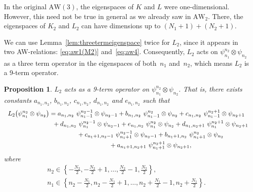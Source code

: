 \documentclass[10pt,a4paper]{amsart}
\numberwithin{equation}{section}
\newtheorem{Proposition}[Theorem]{Proposition}
 { \theoremstyle{definition}
\newtheorem{Definition}[Theorem]{Definition}
\newtheorem{Note}[Theorem]{Note}
\newtheorem{Example}[Theorem]{Example}
\newtheorem{Remark}[Theorem]{Remark} }
\newcommand{\aw}{\mathrm{AW}\!\left(3\right)}
\newcommand{\AW}[1]{\mathrm{AW}_{#1}}
\begin{document}
\begin{Remark}
	In the original $\aw$, the eigenspaces of $K$ and $L$ were one-dimensional. However, this need not be true in general as we already saw in $\AW{2}$. There, the eigenspaces of $K_2$ and $L_2$ can have dimensions up to $(N_1+1)+(N_2+1)$.
\end{Remark}
We can use Lemma~\ref{lem:threetermeigenspace} twice for $L_2$, since it appears in two AW-relations: \eqref{eq:aw1(M2)} and~\eqref{eq:aw4}. Consequently, $L_2$ acts on $\psi_{n_1}^{n_2}\otimes \psi_{n_2}$ as a three term operator in the eigenspaces of both~$n_1$ and~$n_2$, which means $L_2$ is a 9-term operator.
\begin{Proposition}
	$L_2$ acts as a 9-term operator on $\psi_{n_1}^{n_2}\otimes \psi_{n_2}$. That is, there exists constants $a_{n_1,n_2}$, $b_{n_1,n_2}$, $c_{n_1,n_2}$, $d_{n_1,n_2}$ and $e_{n_1,n_2}$ such that
	\begin{gather}
L_2\big(\psi_{n_1}^{n_2}\otimes \psi_{n_2}\big) = a_{n_1,n_2}\ \psi_{n_1-1}^{n_2-1}\otimes \psi_{n_2-1}+b_{n_1,n_2}\ \psi_{n_1-1}^{n_2}\otimes \psi_{n_2}+c_{n_1,n_2}\ \psi_{n_1-1}^{n_2+1}\otimes \psi_{n_2+1}\nonumber\\
\hphantom{L_2\big(\psi_{n_1}^{n_2}\otimes \psi_{n_2}\big) =}{}
+ d_{n_1,n_2}\ \psi_{n_1}^{n_2-1}\otimes \psi_{n_2-1} + e_{n_1,n_2}\ \psi_{n_1}^{n_2}\otimes \psi_{n_2}+d_{n_1,n_2+1}\ \psi_{n_1}^{n_2+1}\otimes \psi_{n_2+1}\nonumber\\
\hphantom{L_2\big(\psi_{n_1}^{n_2}\otimes \psi_{n_2}\big) =}{}
+ c_{n_1+1,n_2-1}\ \psi_{n_1+1}^{n_2-1}\otimes \psi_{n_2-1}+b_{n_1+1,n_2}\ \psi_{n_1+1}^{n_2}\otimes \psi_{n_2}\nonumber\\
\hphantom{L_2\big(\psi_{n_1}^{n_2}\otimes \psi_{n_2}\big) =}{}
+ a_{n_1+1,n_2+1}\ \psi_{n_1+1}^{n_2+1}\otimes \psi_{n_2+1}, \label{eq:9terms}
	\end{gather}
	where
	\begin{gather}
n_2\in\left\{-\frac{N_2}{2},-\frac{N_2}{2}+1,\dots,\frac{N_2}{2}-1,\frac{N_2}{2}\right\},\nonumber\\
n_1\in\left\{n_2-\frac{N_1}{2},n_2-\frac{N_1}{2}+1,\dots,n_2+\frac{N_1}{2}-1,n_2+\frac{N_1}{2}\right\}.\label{eq:n1n2waarvandaan}
	\end{gather}
\end{Proposition}
\end{document}
